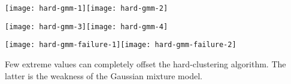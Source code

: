 \documentclass[landscape,footrule]{foils}
\begin{document}

\centerline{
\texttt{[image: hard-gmm-1]}\hspace*{-1.7cm}\texttt{[image: hard-gmm-2]}
\vspace*{-2.6cm}}

\centerline{
\texttt{[image: hard-gmm-3]}\hspace*{-1.7cm}\texttt{[image: hard-gmm-4]}
\vspace*{-3.2cm}}


\centerline{\texttt{[image: hard-gmm-failure-1]}\hspace*{-1.7cm}\texttt{[image: hard-gmm-failure-2]}}
\vspace*{-1cm}

Few extreme values can completely offset the hard-clustering algorithm. The latter is the weakness of the Gaussian mixture model.\vspace*{-0.5cm}
\end{document}
